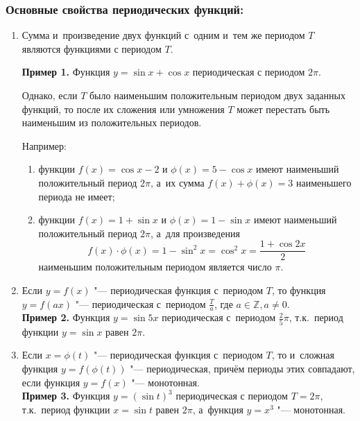 \subsubsection{Основные свойства периодических функций:}
\begin{enumerate}
\item Сумма и~произведение двух функций с~одним и~тем же периодом $T$
являются функциями с периодом $T$.

\textbf{Пример 1.} Функция $y = \sin x + \cos x$ периодическая с периодом $2\pi$.

\begin{Note} Однако, если $T$ было наименьшим положительным периодом
двух заданных функций, то после их сложения или умножения $T$ может перестать
быть наименьшим из положительных периодов.
\end{Note}

Например:
\begin{enumerate}

\item функции $f(x) = \cos x - 2$ и $\phi(x) = 5 - \cos x$ имеют
наименьший положительный период $2\pi$, а~их сумма $f(x) + \phi(x) = 3$
наименьшего периода не имеет;

\item функции $f(x) = 1 + \sin x$ и $\phi(x) = 1 - \sin x$ имеют наименьший
положительный период $2\pi$,
а~для произведения
\begin{equation*}
f(x) \cdot \phi(x) = 1 - \sin^{2} x = \cos^{2} x = \displaystyle\frac{1 + \cos 2 x}{2}
\end{equation*}
наименьшим положительным периодом является число $\pi$.

\end{enumerate}

\item Если $y = f(x)$ "--- периодическая функция с~периодом $T$,
то функция $y = f(ax)$ "--- периодическая с~периодом $\displaystyle\frac{T}{a}$,
где $a \in \mathbb{Z},  a \ne 0$. \\
\indent \textbf{Пример 2.} Функция $y = \sin 5x$ периодическая с~периодом
$\displaystyle\frac{2}{5}\pi$, т.к.\ период функции $y = \sin x$ равен $2\pi$. \\

\item Если $x = \phi(t)$ "--- периодическая функция с~периодом $T$, то и~сложная функция
$y = f(\phi(t))$ "--- периодическая, причём периоды этих совпадают, если функция
$y = f(x)$ "--- монотонная. \\
\indent \textbf{Пример 3.} Функция $y = (\sin t)^{3}$ периодическая с периодом $T = 2\pi$,
т.к.\ период функции $x = \sin t$ равен $2\pi$, а~функция $y = x^{3}$ "--- монотонная.

\end{enumerate}
